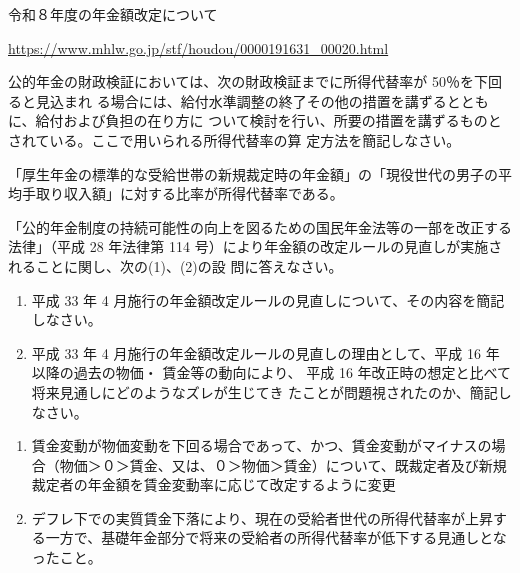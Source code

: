 \begin{explanationbox}
  令和８年度の年金額改定について

  \url{https://www.mhlw.go.jp/stf/houdou/0000191631_00020.html}
\end{explanationbox}

\begin{shortanswer}[年金1 2018 問題2(5)\textcircled{1}]
  公的年金の財政検証においては、次の財政検証までに所得代替率が 50％を下回ると見込まれ
る場合には、給付水準調整の終了その他の措置を講ずるとともに、給付および負担の在り方に
ついて検討を行い、所要の措置を講ずるものとされている。ここで用いられる所得代替率の算
定方法を簡記しなさい。
\end{shortanswer}

\begin{answerbox}
  「厚生年金の標準的な受給世帯の新規裁定時の年金額」の「現役世代の男子の平均手取り収入額」に対する比率が所得代替率である。
\end{answerbox}

\begin{shortanswer}[年金1 H29 問題2(5)]
  「公的年金制度の持続可能性の向上を図るための国民年金法等の一部を改正する法律」（平成 28
年法律第 114 号）により年金額の改定ルールの見直しが実施されることに関し、次の(1)、(2)の設
問に答えなさい。
\begin{enumerate}[(1)]
  \item 平成 33 年 4 月施行の年金額改定ルールの見直しについて、その内容を簡記しなさい。
\item 平成 33 年 4 月施行の年金額改定ルールの見直しの理由として、平成 16 年以降の過去の物価・
賃金等の動向により、 平成 16 年改正時の想定と比べて将来見通しにどのようなズレが生じてき
たことが問題視されたのか、簡記しなさい。
\end{enumerate}

\end{shortanswer}

\begin{answerbox}
  \begin{enumerate}[(1)]
    \item 賃金変動が物価変動を下回る場合であって、かつ、賃金変動がマイナスの場合（物価＞０＞賃金、又は、０＞物価＞賃金）について、既裁定者及び新規裁定者の年金額を賃金変動率に応じて改定するように変更
    \item デフレ下での実質賃金下落により、現在の受給者世代の所得代替率が上昇する一方で、基礎年金部分で将来の受給者の所得代替率が低下する見通しとなったこと。
  \end{enumerate}
\end{answerbox}

